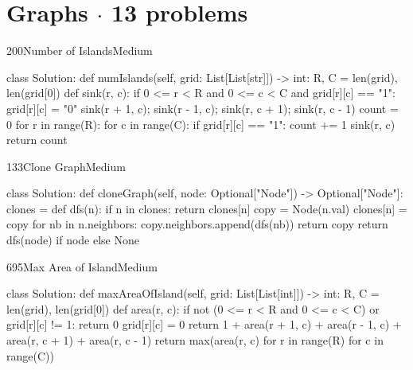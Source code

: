 \section{Graphs {\normalsize\color{muted}$\cdot$ 13 problems}}

\begin{problem}{200}{Number of Islands}{Medium}
\begin{code}
class Solution:
    def numIslands(self, grid: List[List[str]]) -> int:
        R, C = len(grid), len(grid[0])
        def sink(r, c):
            if 0 <= r < R and 0 <= c < C and grid[r][c] == "1":
                grid[r][c] = "0"
                sink(r + 1, c); sink(r - 1, c); sink(r, c + 1); sink(r, c - 1)
        count = 0
        for r in range(R):
            for c in range(C):
                if grid[r][c] == "1":
                    count += 1
                    sink(r, c)
        return count
\end{code}
\end{problem}

\begin{problem}{133}{Clone Graph}{Medium}
\begin{code}
class Solution:
    def cloneGraph(self, node: Optional["Node"]) -> Optional["Node"]:
        clones = {}
        def dfs(n):
            if n in clones:
                return clones[n]
            copy = Node(n.val)
            clones[n] = copy
            for nb in n.neighbors:
                copy.neighbors.append(dfs(nb))
            return copy
        return dfs(node) if node else None
\end{code}
\end{problem}

\begin{problem}{695}{Max Area of Island}{Medium}
\begin{code}
class Solution:
    def maxAreaOfIsland(self, grid: List[List[int]]) -> int:
        R, C = len(grid), len(grid[0])
        def area(r, c):
            if not (0 <= r < R and 0 <= c < C) or grid[r][c] != 1:
                return 0
            grid[r][c] = 0
            return 1 + area(r + 1, c) + area(r - 1, c) + area(r, c + 1) + area(r, c - 1)
        return max(area(r, c) for r in range(R) for c in range(C))
\end{code}
\end{problem}


